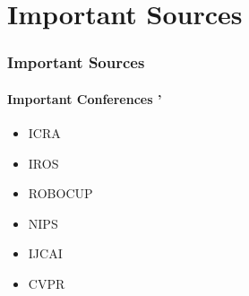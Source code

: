\section{Important Sources}

\begin{frame}
    \frametitle{Important Sources}
    \framesubtitle{Important Conferences '}
    \begin{itemize}
        \item ICRA
        \item IROS
        \item ROBOCUP
        \item NIPS
        \item IJCAI
        \item CVPR
    \end{itemize}
\end{frame}